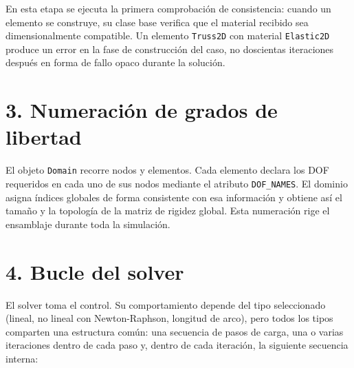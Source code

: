 \documentclass[11pt,oneside]{report}
\begin{document}
En esta etapa se ejecuta la primera comprobación de consistencia: cuando un elemento se construye, su clase base verifica que el material recibido sea dimensionalmente compatible. Un elemento \texttt{Truss2D} con material \texttt{Elastic2D} produce un error en la fase de construcción del caso, no doscientas iteraciones después en forma de fallo opaco durante la solución.

\section*{3. Numeración de grados de libertad}

El objeto \texttt{Domain} recorre nodos y elementos. Cada elemento declara los DOF requeridos en cada uno de sus nodos mediante el atributo \texttt{DOF\_NAMES}. El dominio asigna índices globales de forma consistente con esa información y obtiene así el tamaño y la topología de la matriz de rigidez global. Esta numeración rige el ensamblaje durante toda la simulación.

\section*{4. Bucle del solver}

El solver toma el control. Su comportamiento depende del tipo seleccionado (lineal, no lineal con Newton-Raphson, longitud de arco), pero todos los tipos comparten una estructura común: una secuencia de pasos de carga, una o varias iteraciones dentro de cada paso y, dentro de cada iteración, la siguiente secuencia interna:
\end{document}
